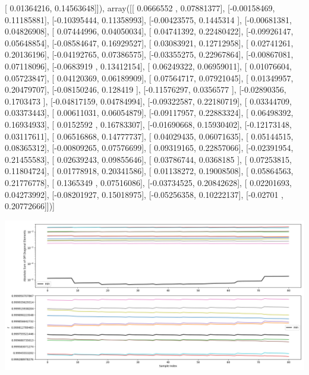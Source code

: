 \documentclass{article}
\begin{document}
       [ 0.01364216,  0.14563648]]), array([[ 0.0666552 ,  0.07881377],
       [-0.00158469,  0.11185881],
       [-0.10395444,  0.11358993],
       [-0.00423575,  0.1445314 ],
       [-0.00681381,  0.04826908],
       [ 0.07444996,  0.04050034],
       [ 0.04741392,  0.22480422],
       [-0.09926147,  0.05648854],
       [-0.08584647,  0.16929527],
       [ 0.03083921,  0.12712958],
       [ 0.02741261,  0.20136196],
       [-0.04192765,  0.07386575],
       [-0.03355275,  0.22967864],
       [-0.00867081,  0.07118096],
       [-0.0683919 ,  0.13412154],
       [ 0.06249322,  0.06959011],
       [ 0.01076604,  0.05723847],
       [ 0.04120369,  0.06189909],
       [ 0.07564717,  0.07921045],
       [ 0.01349957,  0.20479707],
       [-0.08150246,  0.128419  ],
       [-0.11576297,  0.0356577 ],
       [-0.02890356,  0.1703473 ],
       [-0.04817159,  0.04784994],
       [-0.09322587,  0.22180719],
       [ 0.03344709,  0.03373443],
       [ 0.00611031,  0.06054879],
       [-0.09117957,  0.22883324],
       [ 0.06498392,  0.16934933],
       [ 0.0152592 ,  0.16783307],
       [-0.01690668,  0.15930402],
       [-0.12173148,  0.03117611],
       [ 0.06516868,  0.14777737],
       [ 0.04029435,  0.06071635],
       [ 0.05144515,  0.08365312],
       [-0.00809265,  0.07576699],
       [ 0.09319165,  0.22857066],
       [-0.02391954,  0.21455583],
       [ 0.02639243,  0.09855646],
       [ 0.03786744,  0.0368185 ],
       [ 0.07253815,  0.11804724],
       [ 0.01778918,  0.20341586],
       [ 0.01138272,  0.19008508],
       [ 0.05864563,  0.21776778],
       [ 0.1365349 ,  0.07516086],
       [-0.03734525,  0.20842628],
       [ 0.02201693,  0.04273992],
       [-0.08201927,  0.15018975],
       [-0.05256358,  0.10222137],
       [-0.02701   ,  0.20772666]])]
\begin{center}
\includegraphics[scale=.9]{report_pickled_controls165/control_dpn_all.png}

\end{center}
\end{document}
